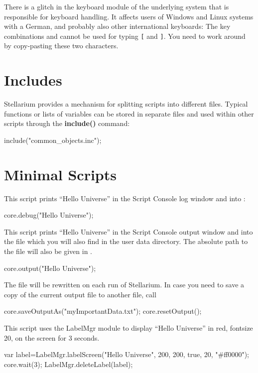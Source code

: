 There is a glitch in the keyboard module of the underlying system that
is responsible for keyboard handling. It affects users of Windows and
Linux systems with a German, and probably also other international
keyboards: The key combinations  and  cannot
be used for typing \verb+[+ and \verb+]+. You need to work around by
copy-pasting these two characters.

\section{Includes}
\label{sec:scripting:includes}

Stellarium provides a mechanism for splitting scripts into different
files. Typical functions or lists of variables can be stored in
separate  files and used within other scripts through the
\textbf{include()} command:
\begin{script}
include("common_objects.inc");
\end{script}


\section{Minimal Scripts}
\label{sec:scripting:MinimalScript}
This script prints ``Hello Universe'' in the Script Console log window and into :
\begin{script}
core.debug("Hello Universe");
\end{script}

\noindent This script prints ``Hello Universe'' in the Script Console output window and into the file  
which you will also find in the user data directory. The absolute path to the file will also be given in .
\begin{script}
core.output("Hello Universe");
\end{script}
The file  will be rewritten on each run of Stellarium. In case you need to save a copy of the current output file to another file, call 
\begin{script}
core.saveOutputAs("myImportantData.txt");
core.resetOutput();
\end{script}

\noindent This script uses the LabelMgr module to display ``Hello Universe'' in red, fontsize 20, on the screen for 3 seconds.
\begin{script}
var label=LabelMgr.labelScreen("Hello Universe", 200, 200, 
                               true, 20, "#ff0000");
core.wait(3);
LabelMgr.deleteLabel(label);
\end{script}

